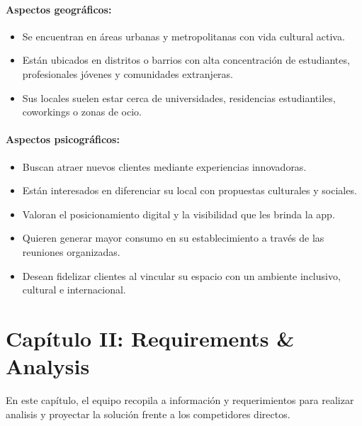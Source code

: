 \paragraph{Aspectos
geográficos:}\label{report__10-cap1-introduccion.md__aspectos-geogruxe1ficos-1}

\begin{itemize}
\tightlist
\item
  Se encuentran en áreas urbanas y metropolitanas con vida cultural
  activa.
\item
  Están ubicados en distritos o barrios con alta concentración de
  estudiantes, profesionales jóvenes y comunidades extranjeras.
\item
  Sus locales suelen estar cerca de universidades, residencias
  estudiantiles, coworkings o zonas de ocio.
\end{itemize}

\paragraph{Aspectos
psicográficos:}\label{report__10-cap1-introduccion.md__aspectos-psicogruxe1ficos-1}

\begin{itemize}
\tightlist
\item
  Buscan atraer nuevos clientes mediante experiencias innovadoras.
\item
  Están interesados en diferenciar su local con propuestas culturales y
  sociales.
\item
  Valoran el posicionamiento digital y la visibilidad que les brinda la
  app.
\item
  Quieren generar mayor consumo en su establecimiento a través de las
  reuniones organizadas.
\item
  Desean fidelizar clientes al vincular su espacio con un ambiente
  inclusivo, cultural e internacional.
\end{itemize}

\newpage

\section{Capítulo II: Requirements \&
Analysis}\label{report__20-cap2-requirements-analysis.md__capuxedtulo-ii-requirements-analysis}

En este capítulo, el equipo recopila a información y requerimientos para
realizar analisis y proyectar la solución frente a los competidores
directos.

